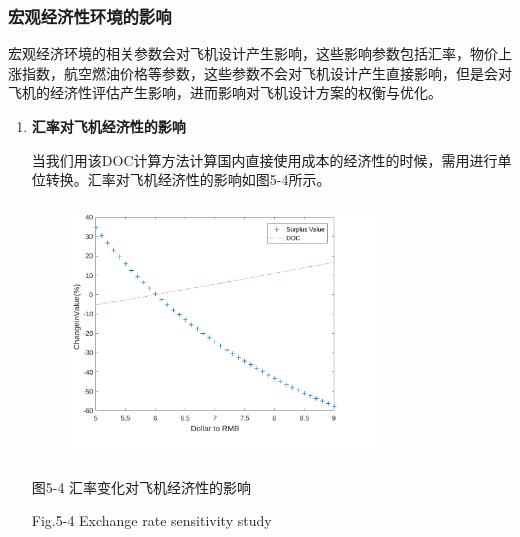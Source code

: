 \documentclass[12pt]{article}
\begin{document}
\subsubsection*{宏观经济性环境的影响}
宏观经济环境的相关参数会对飞机设计产生影响，这些影响参数包括汇率，物价上涨指数，航空燃油价格等参数，这些参数不会对飞机设计产生直接影响，但是会对飞机的经济性评估产生影响，进而影响对飞机设计方案的权衡与优化。\par

\begin{enumerate}
	\item \textbf{汇率对飞机经济性的影响}\par

当我们用该DOC计算方法计算国内直接使用成本的经济性的时候，需用进行单位转换。汇率对飞机经济性的影响如图5-4所示。\par




\begin{figure}[H]
	\begin{Center}
		\includegraphics[width=3.2in,height=2.66in]{./media512/image1.pdf}
	\end{Center}
\end{figure}



\par

\begin{Center}
图5-4 汇率变化对飞机经济性的影响
\end{Center}\par

\begin{Center}
Fig.5-4 Exchange rate sensitivity study 
\end{Center}\par


\end{enumerate}
\end{document}
